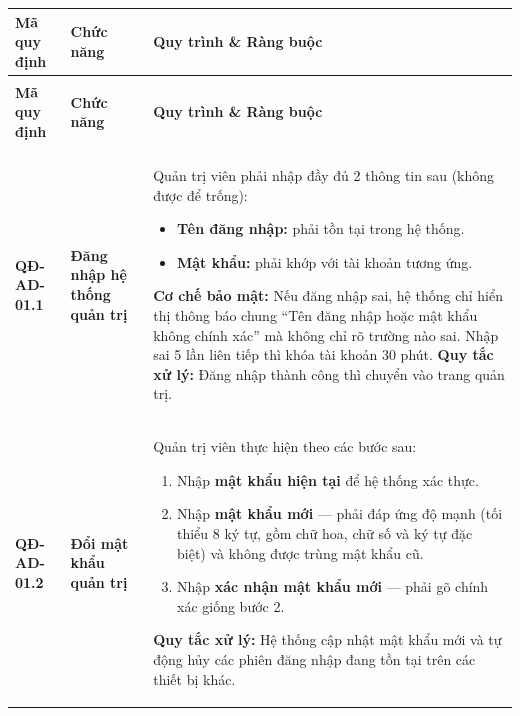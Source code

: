 \documentclass[12pt,a4paper]{article}
\begin{document}
\begin{longtable}{|
        >{\raggedright\arraybackslash}p{2.2cm}|
        >{\raggedright\arraybackslash}p{2.8cm}|
        >{\raggedright\arraybackslash}p{9.8cm}|}
    \hline
    \rowcolor{headerblue}
    \textbf{Mã quy định} & \textbf{Chức năng} & \textbf{Quy trình \& Ràng buộc} \\
    \hline
    \endfirsthead
    \multicolumn{3}{c}{{\tablename\ -- Tiếp theo trang trước}} \\
    \hline
    \rowcolor{headerblue}
    \textbf{Mã quy định} & \textbf{Chức năng} & \textbf{Quy trình \& Ràng buộc} \\
    \hline
    \endhead
    \hline \multicolumn{3}{|r|}{{Tiếp tục ở trang sau...}} \\ \hline
    \endfoot
    \hline
    \endlastfoot
    \textbf{QĐ-AD-01.1} & \textbf{Đăng nhập hệ thống quản trị} &
    Quản trị viên phải nhập đầy đủ 2 thông tin sau (không được để trống):
    \begin{itemize}[leftmargin=*,topsep=2pt,itemsep=1pt]
        \item \textbf{Tên đăng nhập:} phải tồn tại trong hệ thống.
        \item \textbf{Mật khẩu:} phải khớp với tài khoản tương ứng.
    \end{itemize}
    \textbf{Cơ chế bảo mật:} Nếu đăng nhập sai, hệ thống chỉ hiển thị thông báo chung ``Tên đăng nhập hoặc mật khẩu không chính xác'' mà không chỉ rõ trường nào sai. Nhập sai 5 lần liên tiếp thì khóa tài khoản 30 phút. \newline
    \textbf{Quy tắc xử lý:} Đăng nhập thành công thì chuyển vào trang quản trị. \\
    \hline
    \textbf{QĐ-AD-01.2} & \textbf{Đổi mật khẩu quản trị} &
    Quản trị viên thực hiện theo các bước sau:
    \begin{enumerate}[leftmargin=*,topsep=2pt,itemsep=1pt]
        \item Nhập \textbf{mật khẩu hiện tại} để hệ thống xác thực.
        \item Nhập \textbf{mật khẩu mới} --- phải đáp ứng độ mạnh (tối thiểu 8 ký tự, gồm chữ hoa, chữ số và ký tự đặc biệt) và không được trùng mật khẩu cũ.
        \item Nhập \textbf{xác nhận mật khẩu mới} --- phải gõ chính xác giống bước 2.
    \end{enumerate}
    \textbf{Quy tắc xử lý:} Hệ thống cập nhật mật khẩu mới và tự động hủy các phiên đăng nhập đang tồn tại trên các thiết bị khác. \\
    \hline
\end{longtable}
\end{document}
